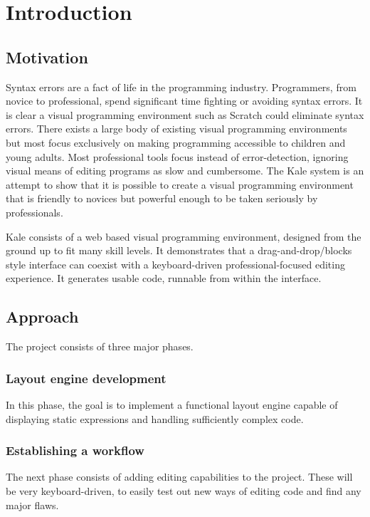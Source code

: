 \chapter{Introduction}

\section{Motivation}
Syntax errors are a fact of life in the programming industry. Programmers, from
novice \citep{Denny2011} to professional, spend significant time fighting or
avoiding syntax errors. It is clear a visual programming environment such
as Scratch could eliminate syntax errors. There exists a large body of existing
visual programming environments \citep{Beldie1983} but most focus exclusively
on making programming accessible to children and young adults. Most
professional tools focus instead of error-detection, ignoring visual means of
editing programs as slow and cumbersome. The Kale system is an attempt to show
that it is possible to create a
visual programming environment that is friendly to novices but powerful enough to be
taken seriously by professionals. 

Kale consists of a web based visual programming environment, designed
from the ground up to fit many skill levels. It demonstrates that a
drag-and-drop/blocks style interface can coexist with a keyboard-driven
professional-focused editing experience. It generates usable code,
runnable from within the interface.

\section{Approach}

The project consists of three major phases.

\subsection{Layout engine development}
In this phase, the goal is to implement a functional layout engine capable
of displaying static expressions and handling sufficiently complex code.

\subsection{Establishing a workflow}
The next phase consists of adding editing capabilities to the project.
These will be very keyboard-driven, to easily test out new ways of editing
code and find any major flaws.

